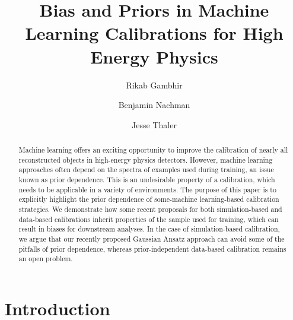 \documentclass[aps,prd,reprint,preprintnumbers,superscriptaddress,nofootinbib,longbibliography,floatfix]{revtex4-1}
\begin{document}
\title{Bias and Priors in Machine Learning Calibrations for High Energy Physics
}


\author{Rikab Gambhir}

\author{Benjamin Nachman}

\author{Jesse Thaler}

\begin{abstract}

Machine learning offers an exciting opportunity to improve the calibration of nearly all reconstructed objects in high-energy physics detectors.
%
However, machine learning approaches often depend on the spectra  of examples used during training, an issue known as prior dependence. 
%
This is an undesirable property of a calibration, which needs to be applicable in a variety of environments. 
%
The purpose of this paper is to explicitly highlight the prior dependence of some-machine learning-based calibration strategies. 
%
We demonstrate how some recent proposals for both simulation-based and data-based calibrations inherit properties of the sample used for training, which can result in biases for downstream analyses. 
%
In the case of simulation-based calibration, we argue that our recently proposed Gaussian Ansatz approach can avoid some of the pitfalls of prior dependence, whereas prior-independent data-based calibration remains an open problem. 
\end{abstract}



\maketitle

{
\tableofcontents
}

\section{Introduction}
\end{document}
